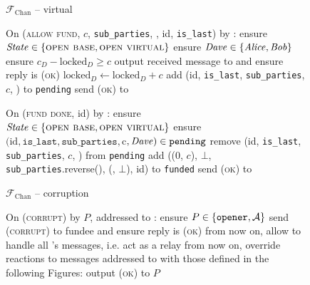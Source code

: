 \begin{figure}[H]
\begin{systembox}{$\mathcal{F}_{\mathrm{Chan}}$ -- virtual}
\begin{algorithmic}[1]
      \State On (\textsc{allow fund}, $c$, \texttt{sub\_parties}, \dave, id,
      \texttt{is\_last}) by \charlie:
      \label{code:functionality:chan:skeleton:virtual:allow-fund}
      \Indent
        \State ensure $\mathit{State} \in \{\textsc{open base}, \textsc{open
        virtual}\}$
        \State ensure $\mathit{Dave} \in \{\mathit{Alice}, \mathit{Bob}\}$
        \State ensure $c_D - \mathrm{locked}_D \geq c$
        \State output received message to \dave and ensure reply is
        \textsc{(ok)}
        \State $\mathrm{locked}_D \gets \mathrm{locked}_D + c$
        \State add (id, \texttt{is\_last}, \texttt{sub\_parties}, $c$, \dave) to
        \texttt{pending}
        \State send (\textsc{ok}) to \charlie
      \EndIndent
      \Statex

      \State On (\textsc{fund done}, id) by \charlie:
      \Indent
        \State ensure $\mathit{State} \in \{\textsc{open base}, \textsc{open
        virtual}\}$
        \State ensure $(\mathrm{id}, \mathtt{is\_last}, \mathtt{sub\_parties},
        $c$, \mathit{Dave}) \in \mathtt{pending}$
        \State remove (id, \texttt{is\_last}, \texttt{sub\_parties}, $c$, \dave)
        from \texttt{pending}
          \State add ((0, $c$), $\bot$, \texttt{sub\_parties}.reverse(),
          (\dave, $\bot$), id) to \texttt{funded}
        \EndIf
        \State send (\textsc{ok}) to \charlie
      \EndIndent
    \end{algorithmic}
  \end{systembox}
  \caption{}
  \label{code:functionality:chan:skeleton:virtual}
\end{figure}

\begin{figure}[H]
  \begin{systembox}{$\mathcal{F}_{\mathrm{Chan}}$ -- corruption}
    \begin{algorithmic}[1]
      \State On (\textsc{corrupt}) by $P$, addressed to \alice:
      \Indent
        \State ensure $P \in \{\mathtt{opener}, \mathcal{A}\}$
          \State send (\textsc{corrupt}) to fundee and ensure reply is
          (\textsc{ok})
        \EndFor
        \State from now on, allow \adversary to handle all \alice's messages,
        i.e. act as a relay
          \State from now on, override reactions to messages addressed to \bob
          with those defined in the following Figures: %
        \EndIf
        \State output (\textsc{ok}) to $P$
      \EndIndent
    \end{algorithmic}
  \end{systembox}
  \caption{}
  \label{code:functionality:chan:skeleton:corruption}
\end{figure}
